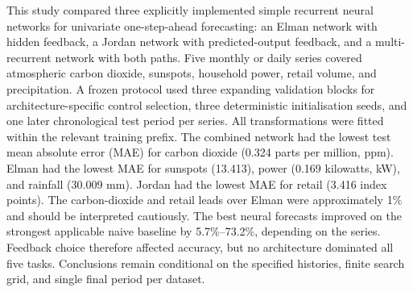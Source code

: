 This study compared three explicitly implemented simple recurrent neural networks for univariate one-step-ahead forecasting: an Elman network with hidden feedback, a Jordan network with predicted-output feedback, and a multi-recurrent network with both paths. Five monthly or daily series covered atmospheric carbon dioxide, sunspots, household power, retail volume, and precipitation. A frozen protocol used three expanding validation blocks for architecture-specific control selection, three deterministic initialisation seeds, and one later chronological test period per series. All transformations were fitted within the relevant training prefix. The combined network had the lowest test mean absolute error (MAE) for carbon dioxide (0.324 parts per million, ppm). Elman had the lowest MAE for sunspots (13.413), power (0.169 kilowatts, kW), and rainfall (30.009 mm). Jordan had the lowest MAE for retail (3.416 index points). The carbon-dioxide and retail leads over Elman were approximately 1\% and should be interpreted cautiously. The best neural forecasts improved on the strongest applicable naive baseline by 5.7\%--73.2\%, depending on the series. Feedback choice therefore affected accuracy, but no architecture dominated all five tasks. Conclusions remain conditional on the specified histories, finite search grid, and single final period per dataset.
